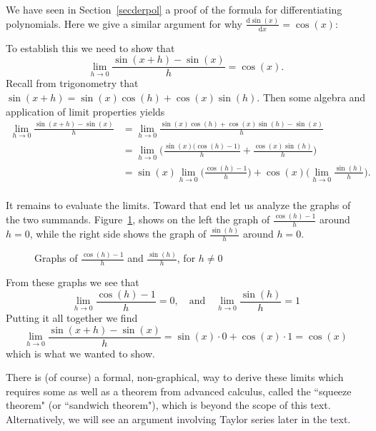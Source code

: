 \begin{bsp}
We have seen in Section~\ref{secderpol} a proof of the formula for
differentiating polynomials. Here we give a similar argument for why
$\displaystyle\frac{\mbox{d}\sin(x)}{\mbox{d}x}=\cos(x)$:

To establish this we need to show that
\[\lim_{h \to 0}\frac{\sin(x+h)-\sin(x)}{h} = \cos(x).\]
Recall from trigonometry that $\sin(x+h) = \sin(x)\cos(h) + \cos(x)\sin(h)$. Then some algebra and application of limit properties yields
\begin{equation*}
\begin{split}
\lim_{h \to 0}\frac{\sin(x+h)-\sin(x)}{h} &= \lim_{h \to 0} \frac{\sin(x)\cos(h) + \cos(x)\sin(h) - \sin(x)}{h} \\
&= \lim_{h \to 0} \bigg(\frac{\sin(x)\big(\cos(h)-1\big)}{h} + \frac{\cos(x)\sin(h)}{h} \bigg) \\
&= \sin(x) \lim_{h \to 0}\bigg(\frac{\cos(h)-1}{h}\bigg) + \cos(x)\bigg(\lim_{h \to 0}\frac{\sin(h)}{h}\bigg).\\
\end{split}
\end{equation*}

It remains to evaluate the limits. Toward that end let us analyze the graphs
of the two summands. Figure~\ref{tnex1figs}, shows on the left the graph of
$\frac{\cos(h)-1}{h}$ around $h=0$, while the right side shows the graph of
$\frac{\sin(h)}{h}$ around $h=0$.

\begin{figure}
\begin{center}
\qquad
\end{center}
\caption{Graphs of $\frac{\cos(h)-1}{h}$ and $\frac{\sin(h)}{h}$, for
$h\neq0$}
\label{tnex1figs}
\end{figure}


From these graphs we see that
\[
\lim_{h \to 0}\frac{\cos(h)-1}{h} = 0, \quad\mbox{and}\quad \lim_{h \to 0}\frac{\sin(h)}{h} = 1
\]
Putting it all together we find
\[\lim_{h \to 0}\frac{\sin(x+h)-\sin(x)}{h} = \sin(x) \cdot 0 + \cos(x) \cdot 1 = \cos(x)\]
which is what we wanted to show.

There is (of course) a formal, non-graphical, way to derive these limits which
requires some as well as a theorem from advanced calculus, called the
``squeeze theorem" (or ``sandwich theorem"), which is beyond the scope of
this text. Alternatively, we will see an argument involving Taylor series
later in the text.
\end{bsp}

